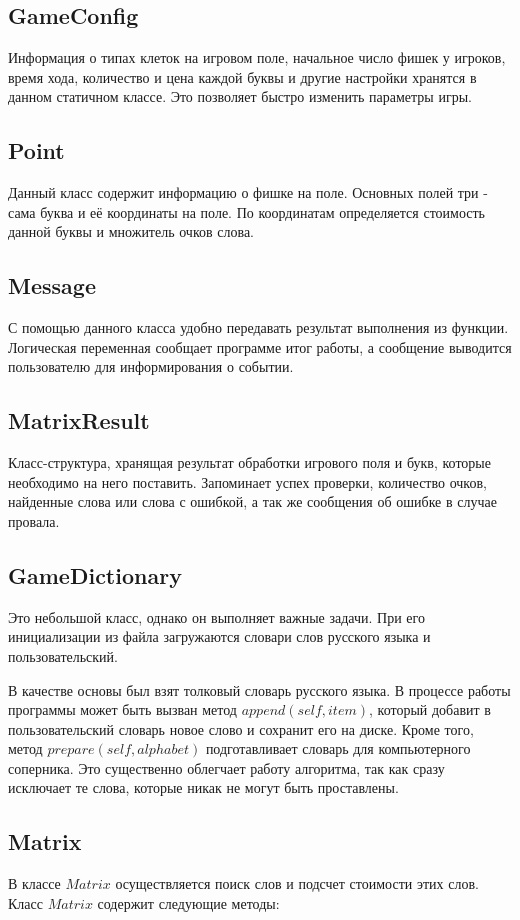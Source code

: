 \documentclass[a4paper,14pt]{article}
\begin{document}
	\subsection{GameConfig}
	Информация о типах клеток на игровом поле, начальное число фишек у игроков, время хода, количество и цена каждой буквы и другие настройки хранятся в данном статичном классе.
	Это позволяет быстро изменить параметры игры.
	
	\subsection{Point}
	Данный класс содержит информацию о фишке на поле.
	Основных полей три - сама буква и её координаты на поле.
	По координатам определяется стоимость данной буквы и множитель очков слова.
	
	\subsection{Message}
	С помощью данного класса удобно передавать результат выполнения из функции.
	Логическая переменная сообщает программе итог работы, а сообщение выводится пользователю для информирования о событии.
	
	\subsection{MatrixResult}
	Класс-структура, хранящая результат обработки игрового поля и букв, которые необходимо на него поставить.
	Запоминает успех проверки, количество очков, найденные слова или слова с ошибкой, а так же сообщения об ошибке в случае провала.
		
	\subsection{GameDictionary}
	Это небольшой класс, однако он выполняет важные задачи.
	При его инициализации из файла загружаются словари слов русского языка и пользовательский.

	В качестве основы был взят толковый словарь русского языка.
	В процессе работы программы может быть вызван метод $append(self, item)$, который добавит в пользовательский словарь новое слово и сохранит его на диске.
	Кроме того, метод $prepare(self, alphabet)$ подготавливает словарь для компьютерного соперника.
	Это существенно облегчает работу алгоритма, так как сразу исключает те слова, которые никак не могут быть проставлены.
	
	\subsection{Matrix}
	В классе $Matrix$ осуществляется поиск слов и подсчет стоимости этих слов. Класс $Matrix$ содержит следующие методы: 
	
\end{document}

